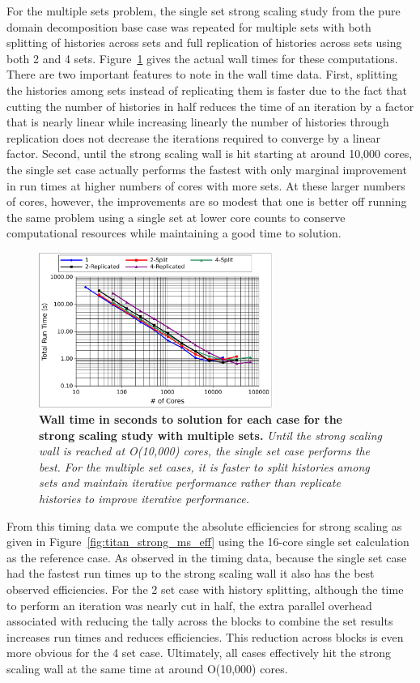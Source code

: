 \documentclass{snamc2013}
\begin{document}
For the multiple sets problem, the single set strong scaling study
from the pure domain decomposition base case was repeated for multiple
sets with both splitting of histories across sets and full replication
of histories across sets using both 2 and 4
sets. Figure~\ref{fig:titan_strong_ms_time} gives the actual wall
times for these computations. There are two important features to note
in the wall time data. First, splitting the histories among sets
instead of replicating them is faster due to the fact that cutting the
number of histories in half reduces the time of an iteration by a
factor that is nearly linear while increasing linearly the number of
histories through replication does not decrease the iterations
required to converge by a linear factor. Second, until the strong
scaling wall is hit starting at around 10,000 cores, the single set
case actually performs the fastest with only marginal improvement in
run times at higher numbers of cores with more sets. At these larger
numbers of cores, however, the improvements are so modest that one is
better off running the same problem using a single set at lower core
counts to conserve computational resources while maintaining a good
time to solution.

\begin{figure}[h!]
  \begin{center}
    \includegraphics[width=3in]{titan_strong_ms_time.pdf}
  \end{center}
  \caption{\textbf{Wall time in seconds to solution for each case for
      the strong scaling study with multiple sets.} \textit{Until the
      strong scaling wall is reached at O(10,000) cores, the single
      set case performs the best. For the multiple set cases, it is
      faster to split histories among sets and maintain iterative
      performance rather than replicate histories to improve iterative
      performance.}}
  \label{fig:titan_strong_ms_time}
\end{figure}

From this timing data we compute the absolute efficiencies for strong
scaling as given in Figure~\ref{fig:titan_strong_ms_eff} using the
16-core single set calculation as the reference case. As observed in
the timing data, because the single set case had the fastest run times
up to the strong scaling wall it also has the best observed
efficiencies. For the 2 set case with history splitting, although the
time to perform an iteration was nearly cut in half, the extra
parallel overhead associated with reducing the tally across the blocks
to combine the set results increases run times and reduces
efficiencies. This reduction across blocks is even more obvious for
the 4 set case. Ultimately, all cases effectively hit the strong
scaling wall at the same time at around O(10,000) cores.
\end{document}
